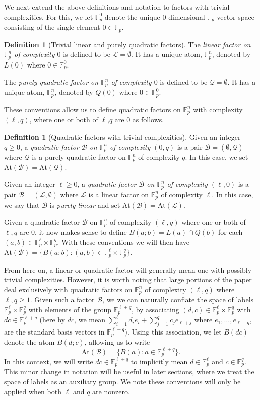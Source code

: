 \documentclass[12pt,oneside,british,a4wide]{amsart}
\numberwithin{equation}{section}
\theoremstyle{definition}
\newtheorem{definition}[theorem]{Definition}
\def\F{\mathbb{F}}
\newcommand{\calL}{\mathcal{L}}
\newcommand{\calB}{\mathcal{B}}
\newcommand{\calQ}{\mathcal{Q}}
\newcommand{\At}{{\mathrm{At}}}
\begin{document}
We next extend  the above definitions and notation to factors with trivial complexities.  For this, we let $\F_p^0$  denote the unique $0$-dimensional $\F_p$-vector space consisting of the single element $0\in \F_p$.  

\begin{definition}[Trivial linear and purely quadratic factors]
The \emph{linear factor on $\F_p^n$ of complexity $0$} is defined to be $\calL=\emptyset$. It has a unique atom, $\F_p^n$, denoted by $L(0)$ where $0\in \F_p^0$.  

The \emph{purely quadratic factor on $\F_p^n$ of complexity $0$} is defined to be $\calQ=\emptyset$. It has a unique atom, $\F_p^n$, denoted by $Q(0)$ where $0\in \F_p^0$.   
\end{definition}
These conventions allow us to define quadratic factors on $\F_p^n$ with complexity    $(\ell,q)$, where one or both of $\ell$,$q$ are $0$ as follows. 

\begin{definition}[Quadratic factors with trivial complexities]
 Given an integer $q\geq 0$, a  \emph{quadratic factor $\calB$ on $\F_p^n$ of complexity $(0,q)$} is a pair $\calB=(\emptyset,\calQ)$ where $\calQ$ is a purely quadratic factor on $\F_p^n$ of complexity $q$. In this case, we   set $\At(\calB)=\At(\calQ)$.  
 
 Given an integer $\ell\geq 0$, a  \emph{quadratic factor $\calB$ on $\F_p^n$ of complexity $(\ell,0)$} is a pair $\calB=(\calL,\emptyset)$ where $\calL$ is a  linear factor on $\F_p^n$ of complexity $\ell$. In this case, we say that $\calB$ is \emph{purely linear} and set $\At(\calB)=\At(\calL)$.  
 \end{definition}

Given a quadratic factor $\calB$ on $\F_p^n$ of complexity $(\ell,q)$ where one or both of $\ell,q$ are $0$,  it now makes sense to define $B(a;b)=L(a)\cap Q(b)$ for each $(a,b)\in \F_p^{\ell}\times \F_p^q$. With these conventions we will then have $\At(\calB)=\{B(a;b): (a,b)\in \F_p^{\ell}\times \F_p^q\}$.  

From here on, a linear or quadratic factor will generally mean one with possibly trivial complexities. However, it is worth noting that large portions of the paper deal exclusively with quadratic factors on $\F_p^n$ of complexity $(\ell,q)$ where $\ell,q\geq 1$.  Given such a factor $\calB$, we we can naturally conflate the space of labels $\F_p^{\ell}\times \F_p^q$ with elements of the group $\F_p^{\ell+q}$, by associating $(d,c)\in \F_p^{\ell}\times \F_p^q$ with $dc\in \F_p^{\ell+q}$ (here by $dc$, we mean $\sum_{i=1}^{\ell}d_ie_i+\sum_{j=1}^qc_je_{\ell+j}$ where $e_1,\ldots, e_{\ell+q}$, are the standard basis vectors in $\F_p^{\ell+q}$).   Using this association,  we let $B(dc)$ denote the atom $B(d;c)$, allowing us to write
$$
\At(\calB)=\{B(a): a\in \F_p^{\ell+q}\}.
$$
In this context, we will write $dc\in \F_p^{\ell+q}$ to implicitly mean $d\in \F_p^{\ell}$ and $c\in \F_p^q$.  
This minor change in notation will be useful in later sections, where we treat the space of labels as an auxiliary group.  We note these conventions will only be applied when both $\ell$ and $q$ are nonzero.
\end{document}
